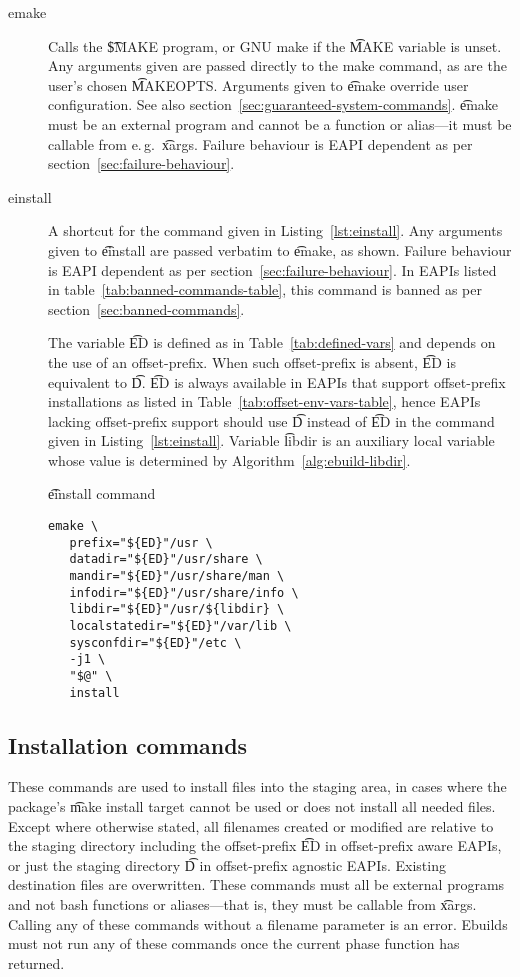 \begin{description}
\item[emake] Calls the \t{\$MAKE} program, or GNU make if the \t{MAKE} variable is unset.
    Any arguments given are passed directly to the make command, as are the user's chosen
    \t{MAKEOPTS}\@. Arguments given to \t{emake} override user configuration. See also
    section~\ref{sec:guaranteed-system-commands}. \t{emake} must be an external program and cannot
    be a function or alias---it must be callable from e.\,g.\ \t{xargs}. Failure behaviour is EAPI
    dependent as per section~\ref{sec:failure-behaviour}.
\item[einstall] A shortcut for the command given in Listing~\ref{lst:einstall}. Any arguments given
    to \t{einstall} are passed verbatim to \t{emake}, as shown. Failure behaviour is EAPI dependent
    as per section~\ref{sec:failure-behaviour}.
    In EAPIs listed in table~\ref{tab:banned-commands-table}, this command is banned as per
    section~\ref{sec:banned-commands}.

    The variable \t{ED} is defined as in Table~\ref{tab:defined-vars} and depends on the use of an
    offset-prefix. When such offset-prefix is absent, \t{ED} is equivalent to \t{D}\@. \t{ED} is
    always available in EAPIs that support offset-prefix installations as listed in
    Table~\ref{tab:offset-env-vars-table}, hence EAPIs lacking offset-prefix support should use
    \t{D} instead of \t{ED} in the command given in Listing~\ref{lst:einstall}.
    Variable \t{libdir} is an auxiliary local variable whose value is determined by
    Algorithm~\ref{alg:ebuild-libdir}.

\begin{listing}[H]
\caption{\t{einstall} command} \label{lst:einstall}
\begin{verbatim}
emake \
   prefix="${ED}"/usr \
   datadir="${ED}"/usr/share \
   mandir="${ED}"/usr/share/man \
   infodir="${ED}"/usr/share/info \
   libdir="${ED}"/usr/${libdir} \
   localstatedir="${ED}"/var/lib \
   sysconfdir="${ED}"/etc \
   -j1 \
   "$@" \
   install
\end{verbatim}
\end{listing}

\end{description}

\subsection{Installation commands}
These commands are used to install files into the staging area, in cases where the package's \t{make
install} target cannot be used or does not install all needed files. Except where otherwise stated,
all filenames created or modified are relative to the staging directory including the offset-prefix
\t{ED} in offset-prefix aware EAPIs, or just the staging directory \t{D} in offset-prefix agnostic
EAPIs. Existing destination files are overwritten. These commands must all be external programs and
not bash functions or aliases---that is, they must be callable from \t{xargs}. Calling any of these
commands without a filename parameter is an error. Ebuilds must not run any of these commands once
the current phase function has returned.

